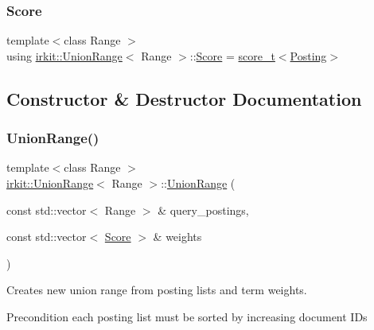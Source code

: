 \mbox{\label{classirkit_1_1UnionRange_a47fb098a85581f5e33f4203e16245dae}} 
\subsubsection{\texorpdfstring{Score}{Score}}
{\footnotesize\ttfamily template$<$class Range $>$ \\
using \hyperlink{classirkit_1_1UnionRange}{irkit\+::\+Union\+Range}$<$ Range $>$\+::\hyperlink{classirkit_1_1UnionRange_a47fb098a85581f5e33f4203e16245dae}{Score} =  \hyperlink{namespaceirkit_a754dabe3346f950c948e7596d9d46c71}{score\+\_\+t}$<$\hyperlink{classirkit_1_1UnionRange_a5f694970419f5a60d7fd41d740556229}{Posting}$>$\hspace{0.3cm}{\ttfamily [protected]}}



\subsection{Constructor \& Destructor Documentation}
\mbox{\label{classirkit_1_1UnionRange_ae37ac22afd534bf0f7c2df98911723f3}} 
\subsubsection{\texorpdfstring{Union\+Range()}{UnionRange()}}
{\footnotesize\ttfamily template$<$class Range $>$ \\
\hyperlink{classirkit_1_1UnionRange}{irkit\+::\+Union\+Range}$<$ Range $>$\+::\hyperlink{classirkit_1_1UnionRange}{Union\+Range} (\begin{DoxyParamCaption}\item[{const std\+::vector$<$ Range $>$ \&}]{query\+\_\+postings,  }\item[{const std\+::vector$<$ \hyperlink{classirkit_1_1UnionRange_a47fb098a85581f5e33f4203e16245dae}{Score} $>$ \&}]{weights }\end{DoxyParamCaption})\hspace{0.3cm}{\ttfamily [inline]}}

Creates new union range from posting lists and term weights. \begin{DoxyPrecond}{Precondition}
each posting list must be sorted by increasing document I\+Ds 
\end{DoxyPrecond}

